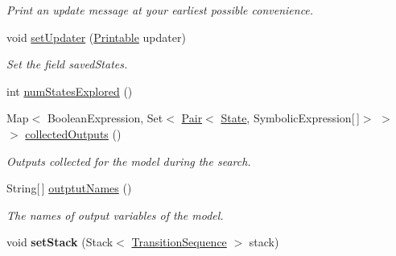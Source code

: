 \begin{DoxyCompactItemize}
\begin{DoxyCompactList}\small\item\em Print an update message at your earliest possible convenience. \end{DoxyCompactList}\item 
void \hyperlink{classedu_1_1udel_1_1cis_1_1vsl_1_1civl_1_1kripke_1_1common_1_1CommonStateManager_a3f19203b7034a9ee8794e5f6a05ed6aa}{set\+Updater} (\hyperlink{interfaceedu_1_1udel_1_1cis_1_1vsl_1_1civl_1_1util_1_1IF_1_1Printable}{Printable} updater)
\begin{DoxyCompactList}\small\item\em Set the field saved\+States. \end{DoxyCompactList}\item 
int \hyperlink{classedu_1_1udel_1_1cis_1_1vsl_1_1civl_1_1kripke_1_1common_1_1CommonStateManager_af4424baea771eb2e7d30f37e985141e3}{num\+States\+Explored} ()
\item 
Map$<$ Boolean\+Expression, Set$<$ \hyperlink{classedu_1_1udel_1_1cis_1_1vsl_1_1civl_1_1util_1_1IF_1_1Pair}{Pair}$<$ \hyperlink{interfaceedu_1_1udel_1_1cis_1_1vsl_1_1civl_1_1state_1_1IF_1_1State}{State}, Symbolic\+Expression\mbox{[}$\,$\mbox{]}$>$ $>$ $>$ \hyperlink{classedu_1_1udel_1_1cis_1_1vsl_1_1civl_1_1kripke_1_1common_1_1CommonStateManager_a9a40f2333f5c64e6d2531306f7afd4e3}{collected\+Outputs} ()
\begin{DoxyCompactList}\small\item\em Outputs collected for the model during the search. \end{DoxyCompactList}\item 
String\mbox{[}$\,$\mbox{]} \hyperlink{classedu_1_1udel_1_1cis_1_1vsl_1_1civl_1_1kripke_1_1common_1_1CommonStateManager_a2c390debbd0af4de52dd58e0ccaf62bf}{outptut\+Names} ()
\begin{DoxyCompactList}\small\item\em The names of output variables of the model. \end{DoxyCompactList}\item 
\hypertarget{classedu_1_1udel_1_1cis_1_1vsl_1_1civl_1_1kripke_1_1common_1_1CommonStateManager_a8b3b2068023ca07278b5e875d8d1f123}{}void {\bfseries set\+Stack} (Stack$<$ \hyperlink{interfaceedu_1_1udel_1_1cis_1_1vsl_1_1civl_1_1semantics_1_1IF_1_1TransitionSequence}{Transition\+Sequence} $>$ stack)\label{classedu_1_1udel_1_1cis_1_1vsl_1_1civl_1_1kripke_1_1common_1_1CommonStateManager_a8b3b2068023ca07278b5e875d8d1f123}

\end{DoxyCompactItemize}



